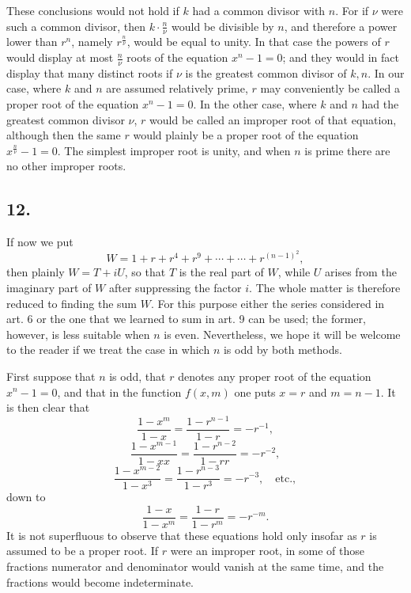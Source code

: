 \documentclass[12pt]{article}
\begin{document}
These conclusions would not hold if $k$ had a common divisor with $n$. For if $\nu$ were such a common divisor, then $k\cdot\frac n\nu$ would be divisible by $n$, and therefore a power lower than $r^n$, namely $r^{\frac n\nu}$, would be equal to unity. In that case the powers of $r$ would display at most $\frac n\nu$ roots of the equation $x^n-1=0$; and they would in fact display that many distinct roots if $\nu$ is the greatest common divisor of $k,n$. In our case, where $k$ and $n$ are assumed relatively prime, $r$ may conveniently be called a proper root of the equation $x^n-1=0$. In the other case, where $k$ and $n$ had the greatest common divisor $\nu$, $r$ would be called an improper root of that equation, although then the same $r$ would plainly be a proper root of the equation $x^{\frac n\nu}-1=0$. The simplest improper root is unity, and when $n$ is prime there are no other improper roots.

\subsection*{12.}

If now we put
\[
W=1+r+r^4+r^9+\cdots+\cdots+r^{(n-1)^2},
\]
then plainly $W=T+iU$, so that $T$ is the real part of $W$, while $U$ arises from the imaginary part of $W$ after suppressing the factor $i$. The whole matter is therefore reduced to finding the sum $W$. For this purpose either the series considered in art. 6 or the one that we learned to sum in art. 9 can be used; the former, however, is less suitable when $n$ is even. Nevertheless, we hope it will be welcome to the reader if we treat the case in which $n$ is odd by both methods.

First suppose that $n$ is odd, that $r$ denotes any proper root of the equation $x^n-1=0$, and that in the function $f(x,m)$ one puts $x=r$ and $m=n-1$. It is then clear that
\[
\frac{1-x^m}{1-x}=\frac{1-r^{n-1}}{1-r}=-r^{-1},
\]
\[
\frac{1-x^{m-1}}{1-xx}=\frac{1-r^{n-2}}{1-rr}=-r^{-2},
\]
\[
\frac{1-x^{m-2}}{1-x^3}=\frac{1-r^{n-3}}{1-r^3}=-r^{-3},\quad\text{etc.},
\]
down to
\[
\frac{1-x}{1-x^m}=\frac{1-r}{1-r^m}=-r^{-m}.
\]
It is not superfluous to observe that these equations hold only insofar as $r$ is assumed to be a proper root. If $r$ were an improper root, in some of those fractions numerator and denominator would vanish at the same time, and the fractions would become indeterminate.
\end{document}
